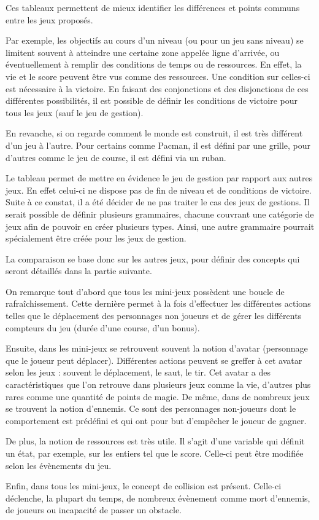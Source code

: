 \vspace{0.5cm}

Ces tableaux permettent de mieux identifier les différences et points communs entre les jeux proposés.

Par exemple, les objectifs au cours d'un niveau (ou pour un jeu sans niveau) se limitent souvent à atteindre une certaine zone
appelée ligne d'arrivée, ou éventuellement à remplir des conditions de temps ou de ressources. En effet, la vie et le score
peuvent être vus comme des ressources. Une condition sur celles-ci est nécessaire à la victoire.
En faisant des conjonctions et des disjonctions de ces différentes possibilités, il est possible de définir 
les conditions de victoire pour tous les jeux (sauf le jeu de gestion).

En revanche, si on regarde comment le monde est construit, il est très différent d'un jeu à l'autre.
Pour certains comme Pacman, il est défini par une grille, pour d'autres comme le jeu de course, il est défini via un ruban.

Le tableau permet de mettre en évidence le jeu de gestion par rapport aux autres jeux.
En effet celui-ci ne dispose pas de fin de niveau et de conditions de victoire.
Suite à ce constat, il a été décider de ne pas traiter le cas des jeux de gestions.
Il serait possible de définir plusieurs grammaires, chacune couvrant une catégorie de jeux afin de pouvoir en 
créer plusieurs types. Ainsi, une autre grammaire pourrait spécialement être créée pour les jeux de gestion.

La comparaison se base donc sur les autres jeux, pour définir des concepts qui seront détaillés dans la partie suivante.

On remarque tout d'abord que tous les mini-jeux possèdent une boucle de rafraîchissement.
Cette dernière permet à la fois d'effectuer les différentes actions telles que le déplacement des personnages non joueurs et de gérer 
les différents compteurs du jeu (durée d'une course, d'un bonus).

Ensuite, dans les mini-jeux se retrouvent souvent la notion d'avatar (personnage que le joueur peut déplacer).
Différentes actions peuvent se greffer à cet avatar selon les jeux : souvent le déplacement, le saut, le tir.
Cet avatar a des caractéristiques que l'on retrouve dans plusieurs jeux comme la vie, d'autres plus rares comme une quantité de points de magie.
De même, dans de nombreux jeux se trouvent la notion d'ennemis. Ce sont des personnages non-joueurs dont le comportement est prédéfini et qui ont pour but d'empêcher le joueur de gagner.

De plus, la notion de ressources est très utile. Il s'agit d'une variable qui définit un état, par exemple, sur les entiers tel que le score.
Celle-ci peut être modifiée selon les évènements du jeu.

Enfin, dans tous les mini-jeux, le concept de collision est présent. Celle-ci déclenche, la plupart du temps, 
de nombreux évènement comme mort d'ennemis, de joueurs ou incapacité de passer un obstacle.